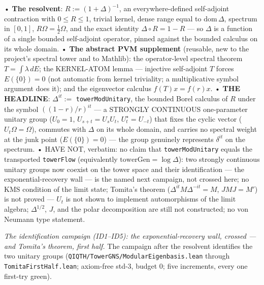 \documentclass[11pt,a4paper]{article}
\begin{document}
  • \textbf{The resolvent}: $R := (1+\Delta)^{-1}$, an everywhere-defined self-adjoint contraction with $0 \le R \le 1$, trivial kernel, dense range equal to $\mathrm{dom}\,\Delta$, spectrum in $[0,1]$, $R\Omega = \tfrac12\Omega$, and the exact identity $\Delta \circ R = 1 - R$ — so $\Delta$ is a function of a single bounded self-adjoint operator, pinned against the bounded calculus on its whole domain.
  • \textbf{The abstract PVM supplement} (reusable, new to the project's spectral tower and to Mathlib): the operator-level spectral theorem $T = \int \lambda\, dE$; the KERNEL-ATOM lemma — injective self-adjoint $T$ forces $E(\{0\}) = 0$ (not automatic from kernel triviality; a multiplicative symbol argument does it); and the eigenvector calculus $f(T)x = f(r)x$.
  • \textbf{THE HEADLINE}: $\Delta^{it} :=$ \texttt{towerModUnitary}, the bounded Borel calculus of $R$ under the symbol $((1-r)/r)^{it}$ — a STRONGLY CONTINUOUS one-parameter unitary group ($U_0 = 1$, $U_{s+t} = U_sU_t$, $U_t^\star = U_{-t}$) that fixes the cyclic vector ($U_t\Omega = \Omega$), commutes with $\Delta$ on its whole domain, and carries no spectral weight at the junk point ($E(\{0\}) = 0$) — the group genuinely represents $\delta^{it}$ on the spectrum.
  • HAVE NOT, verbatim: no claim that \texttt{towerModUnitary} equals the transported \texttt{towerFlow} (equivalently $\mathrm{towerGen} = \log\Delta$): two strongly continuous unitary groups now coexist on the tower space and their identification — the exponential-recovery wall — is the named next campaign, not crossed here; no KMS condition of the limit state; Tomita's theorem ($\Delta^{it} M \Delta^{-it} = M$, $JMJ = M'$) is not proved — $U_t$ is not shown to implement automorphisms of the limit algebra; $\Delta^{1/2}$, $J$, and the polar decomposition are still not constructed; no von Neumann type statement.

\emph{The identification campaign (ID1--ID5): the exponential-recovery wall, crossed — and Tomita's theorem, first half.} The campaign after the resolvent identifies the two unitary groups (\texttt{QIQTH/TowerGNS/ModularEigenbasis.lean} through \texttt{TomitaFirstHalf.lean}; axiom-free std-3, budget 0; five increments, every one first-try green).
\end{document}

